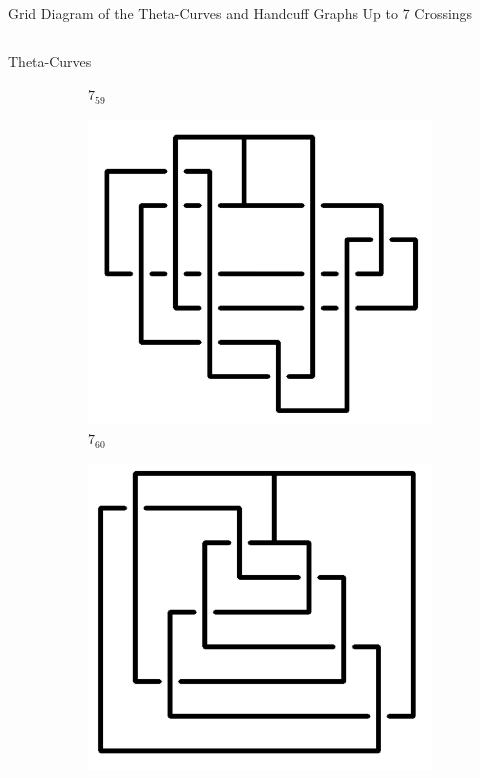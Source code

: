 \documentclass[final]{beamer}
\begin{document}
\begin{frame}[t]
\begin{alertblock}{Grid Diagram of the Theta-Curves and Handcuff Graphs Up to 7 Crossings}
\begin{columns}[t]
\begin{column}{0.5\textwidth}
\begin{alertblock}{Theta-Curves}
\begin{figure}
\begin{subfigure}{0.075\textwidth}
    \caption{$7_{59}$} 
    \end{subfigure}
    \begin{subfigure}{0.075\textwidth}
    \includegraphics[width=\columnwidth]{../Midterm_Poster/grid_diagram/theta_7_60.png}
    \caption{$7_{60}$} 
    \end{subfigure}
    \begin{subfigure}{0.075\textwidth}
    \includegraphics[width=\columnwidth]{../Midterm_Poster/grid_diagram/theta_7_61.png}

\end{subfigure}
\end{figure}
\end{alertblock}
\end{column}
\end{columns}
\end{alertblock}
\end{frame}
\end{document}

